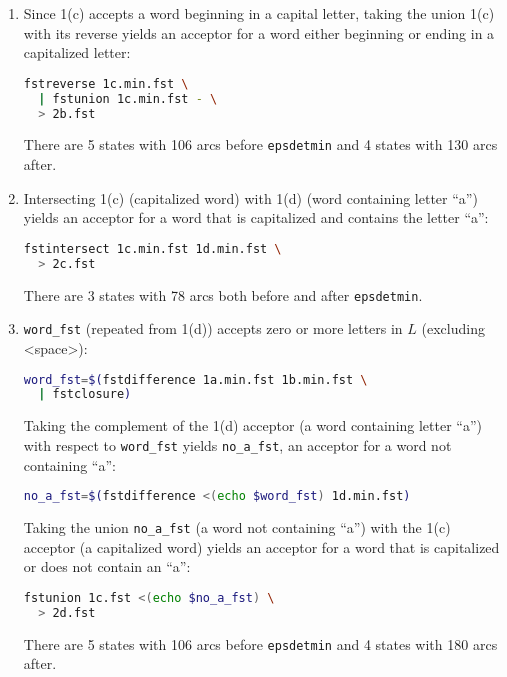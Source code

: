 \documentclass[a4paper,oneside,reqno]{amsart}
\begin{document}
\begin{enumerate}[label=\arabic*.]
\begin{enumerate}[label=(\alph*)]
      \item Since 1(c) accepts a word beginning in a capital letter, taking the union
        1(c) with its reverse yields an acceptor for a word either beginning or
        ending in a capitalized letter:
        \begin{lstlisting}[language=bash]
fstreverse 1c.min.fst \
  | fstunion 1c.min.fst - \
  > 2b.fst
        \end{lstlisting}
        There are 5 states with 106 arcs before \texttt{epsdetmin} and 4
        states with 130 arcs after.

      \item Intersecting 1(c) (capitalized word) with 1(d) (word containing
        letter ``a'') yields an acceptor for a word that is capitalized and
        contains the letter ``a'':
        \begin{lstlisting}[language=bash]
fstintersect 1c.min.fst 1d.min.fst \
  > 2c.fst
        \end{lstlisting}
        There are 3 states with 78 arcs both before and after \texttt{epsdetmin}.

      \item \texttt{word\_fst} (repeated from 1(d)) accepts zero or more
        letters in $L$ (excluding <space>):
        \begin{lstlisting}[language=bash]
word_fst=$(fstdifference 1a.min.fst 1b.min.fst \
  | fstclosure)
        \end{lstlisting}

        Taking the complement of the 1(d) acceptor (a word containing letter
        ``a'') with respect to \texttt{word\_fst} yields \texttt{no\_a\_fst},
        an acceptor for a word not containing ``a'':
        \begin{lstlisting}[language=bash]
no_a_fst=$(fstdifference <(echo $word_fst) 1d.min.fst)
        \end{lstlisting}

        Taking the union \texttt{no\_a\_fst} (a word not containing ``a'') with
        the 1(c) acceptor (a capitalized word) yields an acceptor for
        a word that is capitalized or does not contain an ``a'':
        \begin{lstlisting}[language=bash]
fstunion 1c.fst <(echo $no_a_fst) \
  > 2d.fst
        \end{lstlisting}
        There are 5 states with 106 arcs before \texttt{epsdetmin} and 4
        states with 180 arcs after.


\end{enumerate}
\end{enumerate}
\end{document}
